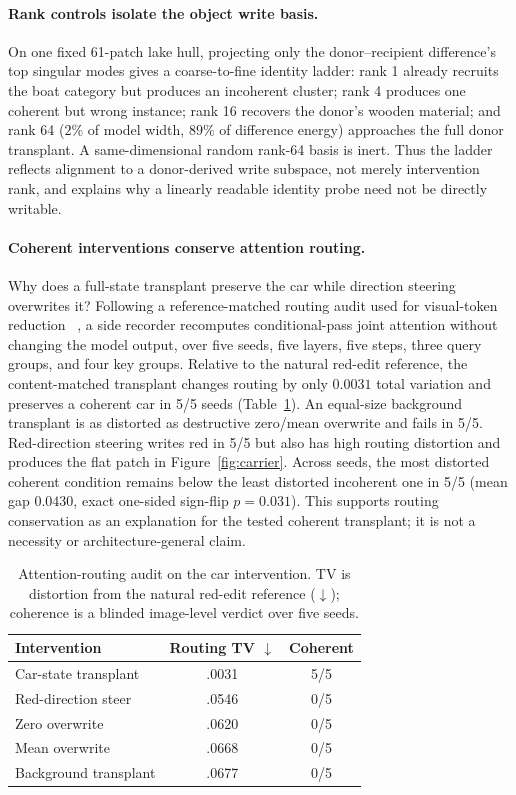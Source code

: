 \paragraph{Rank controls isolate the object write basis.} On one fixed
61-patch lake hull, projecting only the donor--recipient difference's top
singular modes gives a coarse-to-fine identity ladder: rank 1 already recruits
the boat category but produces an incoherent cluster; rank 4 produces one
coherent but wrong instance; rank 16 recovers the donor's wooden material; and
rank 64 ($2\%$ of model width, $89\%$ of difference energy) approaches the
full donor transplant. A same-dimensional random rank-64 basis is inert. Thus
the ladder reflects alignment to a donor-derived write subspace, not merely
intervention rank, and explains why a linearly readable identity probe need not
be directly writable.

\paragraph{Coherent interventions conserve attention routing.} Why does a
full-state transplant preserve the car while direction steering overwrites it?
Following a reference-matched routing audit used for visual-token reduction
~\citep{cho2026restore}, a side recorder recomputes conditional-pass joint attention without changing
the model output, over five seeds, five layers, five steps, three query groups,
and four key groups. Relative to the natural red-edit reference, the
content-matched transplant changes routing by only $0.0031$ total variation and
preserves a coherent car in 5/5 seeds (Table~\ref{tab:routing}). An equal-size
background transplant is as distorted as destructive zero/mean overwrite and
fails in 5/5. Red-direction steering writes red in 5/5 but also has high routing
distortion and produces the flat patch in Figure~\ref{fig:carrier}. Across
seeds, the most distorted coherent condition remains below the least distorted
incoherent one in 5/5 (mean gap $0.0430$, exact one-sided sign-flip
$p{=}0.031$). This supports routing conservation as an explanation for the
tested coherent transplant; it is not a necessity or architecture-general
claim.

\begin{table}[t]
\caption{Attention-routing audit on the car intervention. TV is distortion
from the natural red-edit reference ($\downarrow$); coherence is a blinded
image-level verdict over five seeds.}
\label{tab:routing}
\centering
\footnotesize
\setlength{\tabcolsep}{4pt}
\begin{tabular}{@{}lcc@{}}
\toprule
Intervention & Routing TV $\downarrow$ & Coherent \\
\midrule
Car-state transplant & .0031 & 5/5 \\
Red-direction steer & .0546 & 0/5 \\
Zero overwrite & .0620 & 0/5 \\
Mean overwrite & .0668 & 0/5 \\
Background transplant & .0677 & 0/5 \\
\bottomrule
\end{tabular}
\end{table}

